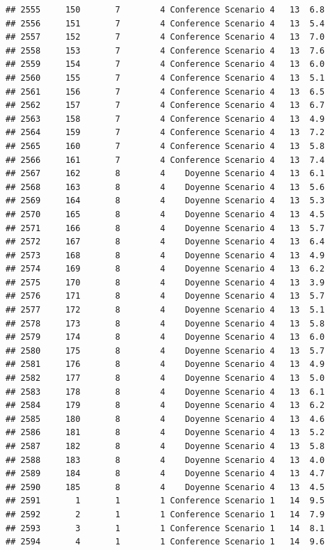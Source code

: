 \documentclass[
]{article}
\begin{document}
\begin{verbatim}
## 2555     150       7        4 Conference Scenario 4   13  6.8
## 2556     151       7        4 Conference Scenario 4   13  5.4
## 2557     152       7        4 Conference Scenario 4   13  7.0
## 2558     153       7        4 Conference Scenario 4   13  7.6
## 2559     154       7        4 Conference Scenario 4   13  6.0
## 2560     155       7        4 Conference Scenario 4   13  5.1
## 2561     156       7        4 Conference Scenario 4   13  6.5
## 2562     157       7        4 Conference Scenario 4   13  6.7
## 2563     158       7        4 Conference Scenario 4   13  4.9
## 2564     159       7        4 Conference Scenario 4   13  7.2
## 2565     160       7        4 Conference Scenario 4   13  5.8
## 2566     161       7        4 Conference Scenario 4   13  7.4
## 2567     162       8        4    Doyenne Scenario 4   13  6.1
## 2568     163       8        4    Doyenne Scenario 4   13  5.6
## 2569     164       8        4    Doyenne Scenario 4   13  5.3
## 2570     165       8        4    Doyenne Scenario 4   13  4.5
## 2571     166       8        4    Doyenne Scenario 4   13  5.7
## 2572     167       8        4    Doyenne Scenario 4   13  6.4
## 2573     168       8        4    Doyenne Scenario 4   13  4.9
## 2574     169       8        4    Doyenne Scenario 4   13  6.2
## 2575     170       8        4    Doyenne Scenario 4   13  3.9
## 2576     171       8        4    Doyenne Scenario 4   13  5.7
## 2577     172       8        4    Doyenne Scenario 4   13  5.1
## 2578     173       8        4    Doyenne Scenario 4   13  5.8
## 2579     174       8        4    Doyenne Scenario 4   13  6.0
## 2580     175       8        4    Doyenne Scenario 4   13  5.7
## 2581     176       8        4    Doyenne Scenario 4   13  4.9
## 2582     177       8        4    Doyenne Scenario 4   13  5.0
## 2583     178       8        4    Doyenne Scenario 4   13  6.1
## 2584     179       8        4    Doyenne Scenario 4   13  6.2
## 2585     180       8        4    Doyenne Scenario 4   13  4.6
## 2586     181       8        4    Doyenne Scenario 4   13  5.2
## 2587     182       8        4    Doyenne Scenario 4   13  5.8
## 2588     183       8        4    Doyenne Scenario 4   13  4.0
## 2589     184       8        4    Doyenne Scenario 4   13  4.7
## 2590     185       8        4    Doyenne Scenario 4   13  4.5
## 2591       1       1        1 Conference Scenario 1   14  9.5
## 2592       2       1        1 Conference Scenario 1   14  7.9
## 2593       3       1        1 Conference Scenario 1   14  8.1
## 2594       4       1        1 Conference Scenario 1   14  9.6

\end{verbatim}
\end{document}
